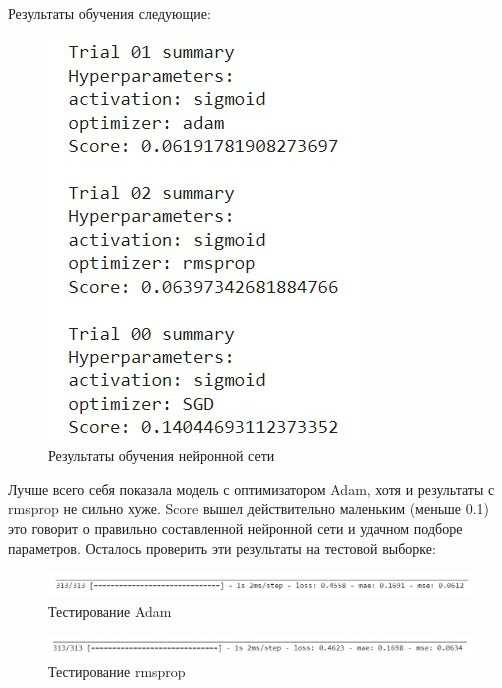 \documentclass[bachelor, och, diploma]{SCWorks}
\begin{document}
Результаты обучения следующие: 

\begin{figure}[ht!]

	\centering
	
	\includegraphics[width=0.3\linewidth]{pract1.png}
	
	\caption{Результаты обучения нейронной сети}
	
	\label{fig:p1}
	
\end{figure}

Лучше всего себя показала модель с оптимизатором Adam, хотя и результаты с rmsprop не сильно хуже. Score вышел действительно маленьким (меньше 0.1) это говорит о правильно составленной нейронной сети и удачном подборе параметров. Осталось проверить эти результаты на тестовой выборке:


\begin{figure}[ht!]

	\centering
	
	\includegraphics[width=0.8\linewidth]{pract2.png}
	
	\caption{Тестирование Adam}
	
	\label{fig:p2}
	
\end{figure}

\begin{figure}[ht!]

	\centering
	
	\includegraphics[width=0.8\linewidth]{pract3.png}
	
	\caption{Тестирование rmsprop}
	
	\label{fig:p3}
	
\end{figure}
\end{document}
